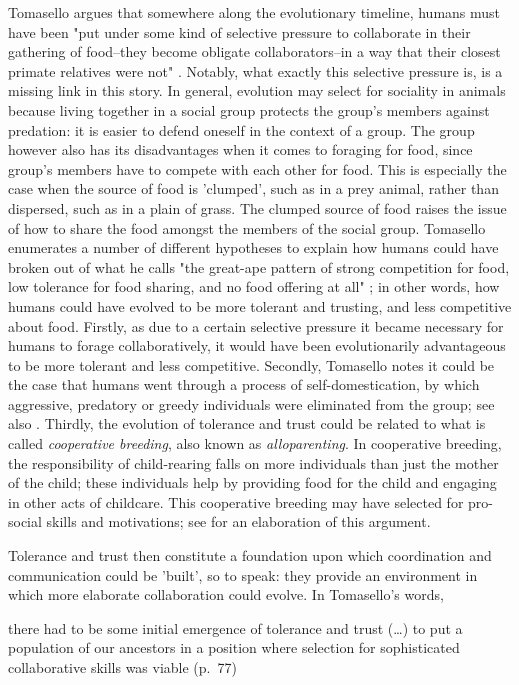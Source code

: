 Tomasello argues that somewhere along the evolutionary timeline, humans must have been "put under some kind of selective pressure to collaborate in their gathering of food--they become obligate collaborators--in a way that their closest primate relatives were not" \citep[p.~75]{Tomasello09}. Notably, what exactly this selective pressure is, is a missing link in this story.
In general, evolution may select for sociality in animals because living together in a social group protects the group's members against predation: it is easier to defend oneself in the context of a group. The group however also has its disadvantages when it comes to foraging for food, since group's members have to compete with each other for food. This is especially the case when the source of food is 'clumped', such as in a prey animal, rather than dispersed, such as in a plain of grass. The clumped source of food raises the issue of how to share the food amongst the members of the social group.
Tomasello enumerates a number of different hypotheses to explain how humans could have broken out of what he calls "the great-ape pattern of strong competition for food, low tolerance for food sharing, and no food offering at all" \citep[p.~83]{Tomasello09}; in other words, how humans could have evolved to be more tolerant and trusting, and less competitive about food.
Firstly, as due to a certain selective pressure it became necessary for humans to forage collaboratively, it would have been evolutionarily advantageous to be more tolerant and less competitive.
Secondly, Tomasello notes it could be the case that humans went through a process of self-domestication, by which aggressive, predatory or greedy individuals were eliminated from the group; see also \citet{Hare17, Benitez21}.
Thirdly, the evolution of tolerance and trust could be related to what is called \emph{cooperative breeding}, also known as \emph{alloparenting}. In cooperative breeding, the responsibility of child-rearing falls on more individuals than just the mother of the child; these individuals help by providing food for the child and engaging in other acts of childcare. This cooperative breeding may have selected for pro-social skills and motivations; see \citet{Hrdy09} for an elaboration of this argument.

Tolerance and trust then constitute a foundation upon which coordination and communication could be 'built', so to speak: they provide an environment in which more elaborate collaboration could evolve. In Tomasello's words,
\begin{quoting}
    there had to be some initial emergence of tolerance and trust (\ldots) to put a population of our ancestors in a position where selection for sophisticated collaborative skills was viable
    \hfill (p.~77)
\end{quoting}

